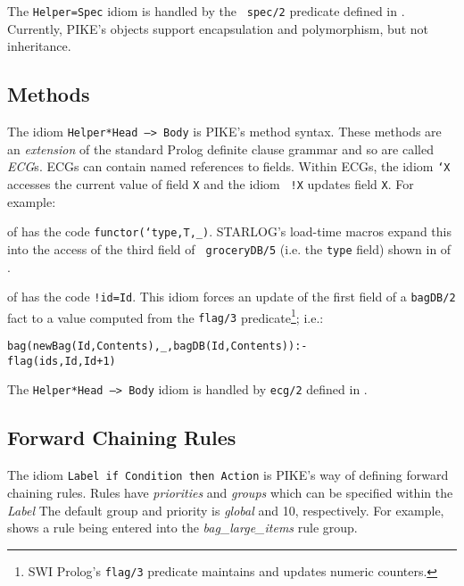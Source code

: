 \documentclass[twocolumn,global]{sys/svjour}
\begin{document}
 The \mbox{{\tt Helper=Spec}} idiom is handled by the {\tt
 spec/2}
 predicate defined in . Currently, PIKE's objects support encapsulation
 and polymorphism, but not inheritance.



\subsection{Methods}

The idiom  \mbox{{\tt Helper*Head --> Body}} is PIKE's method syntax.
These methods are an {\em extension } of the standard Prolog definite
clause grammar and so are called   {\em ECG}s. ECGs can contain named
references to fields. Within ECGs, the idiom {\tt `X} accesses the
current value of field {\tt X} and the idiom {\tt
!X} updates field {\tt X}.  %
For example: \bi \item {} of 
has the code \mbox{{\tt functor(`type,T,_)}}. STARLOG's load-time
macros expand this into the access of the third field of {\tt
groceryDB/5}  (i.e. the {\tt type} field) shown in
 of . \item
{} of  has the code {\tt !id=Id}. This
idiom forces an update of the first field of a {\tt bagDB/2} fact to
a value computed from the {\tt flag/3} predicate\footnote{SWI
Prolog's {\tt flag/3} predicate maintains and updates numeric
counters.}; i.e.: \ei

{\scriptsize
\begin{alltt}
bag(newBag(Id,Contents),_,bagDB(Id,Contents)):-
    flag(ids,Id,Id+1)
\end{alltt}
}

\noindent The  \mbox{{\tt Helper*Head --> Body}} idiom is handled by
{\tt ecg/2} defined in .





\subsection{Forward Chaining Rules}

The idiom  {\tt Label if Condition then Action} is PIKE's way of
defining forward chaining rules. Rules have {\em priorities} and {\em
groups} which can be specified within the {\em Label} The default
group and priority is {\em global} and 10, respectively. For example,
 shows a rule being entered into the {\em
bag\_large\_items} rule group.
\end{document}
